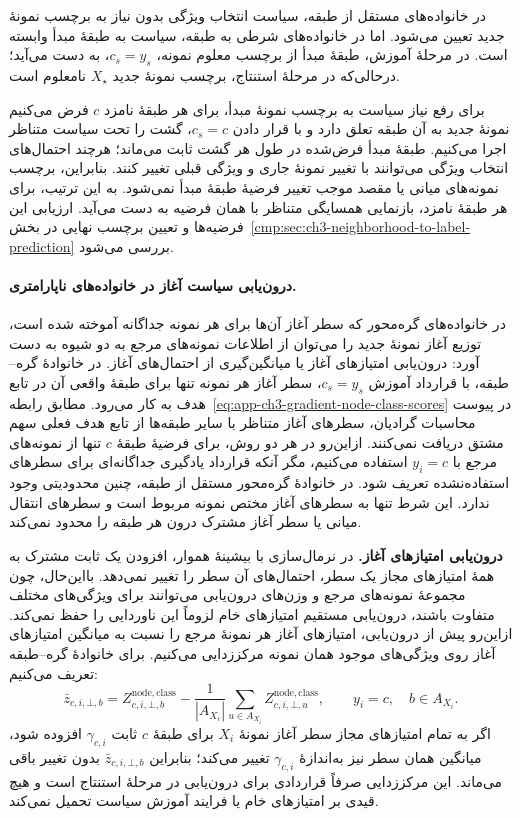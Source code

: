 در خانواده‌های مستقل از طبقه، سیاست انتخاب ویژگی بدون نیاز به
برچسب نمونهٔ جدید تعیین می‌شود. اما در خانواده‌های شرطی به طبقه،
سیاست به طبقهٔ مبدأ وابسته است. در مرحلهٔ آموزش، طبقهٔ مبدأ از برچسب
معلوم نمونه، $c_s=y_s$، به دست می‌آید؛ درحالی‌که در مرحلهٔ استنتاج،
برچسب نمونهٔ جدید $X_\star$ نامعلوم است.

برای رفع نیاز سیاست به برچسب نمونهٔ مبدأ، برای هر طبقهٔ
نامزد $c$ فرض می‌کنیم نمونهٔ جدید
به آن طبقه تعلق دارد و با قرار دادن $c_s=c$، گشت را تحت سیاست
متناظر اجرا می‌کنیم. طبقهٔ مبدأ فرض‌شده در طول هر گشت ثابت می‌ماند؛
هرچند احتمال‌های انتخاب ویژگی می‌توانند با تغییر نمونهٔ جاری و
ویژگی قبلی تغییر کنند. بنابراین، برچسب نمونه‌های میانی یا مقصد
موجب تغییر فرضیهٔ طبقهٔ مبدأ نمی‌شود. به این ترتیب، برای هر طبقهٔ
نامزد، بازنمایی همسایگی متناظر با همان فرضیه به دست می‌آید.
ارزیابی این فرضیه‌ها و تعیین برچسب نهایی در
بخش~\ref{cmp:sec:ch3-neighborhood-to-label-prediction}
بررسی می‌شود.

\paragraph{درون‌یابی سیاست آغاز در خانواده‌های ناپارامتری.}
در خانواده‌های گره‌محور که سطر آغاز آن‌ها برای هر نمونه جداگانه
آموخته شده است، توزیع آغاز نمونهٔ جدید را می‌توان از اطلاعات
نمونه‌های مرجع به دو شیوه به دست آورد: درون‌یابی امتیازهای آغاز
یا میانگین‌گیری از احتمال‌های آغاز.
در خانوادهٔ گره--طبقه، با قرارداد آموزش
$c_s=y_s$، سطر آغاز هر نمونه تنها برای
طبقهٔ واقعی آن در تابع هدف به کار می‌رود.
مطابق رابطه~\eqref{eq:app-ch3-gradient-node-class-scores}
در پیوست محاسبات گرادیان، سطرهای آغاز متناظر
با سایر طبقه‌ها از تابع هدف فعلی سهم مشتق
دریافت نمی‌کنند. ازاین‌رو در هر دو روش،
برای فرضیهٔ طبقهٔ $c$ تنها از نمونه‌های مرجع
با $y_i=c$ استفاده می‌کنیم، مگر آنکه قرارداد
یادگیری جداگانه‌ای برای سطرهای استفاده‌نشده
تعریف شود. در خانوادهٔ گره‌محور مستقل از
طبقه، چنین محدودیتی وجود ندارد.
این شرط تنها به سطرهای آغاز مختص نمونه
مربوط است و سطرهای انتقال میانی یا سطر آغاز
مشترک درون هر طبقه را محدود نمی‌کند.

\noindent\textbf{درون‌یابی امتیازهای آغاز.}
در نرمال‌سازی با بیشینهٔ هموار، افزودن یک ثابت مشترک
به همهٔ امتیازهای مجاز یک سطر، احتمال‌های آن سطر را
تغییر نمی‌دهد. بااین‌حال، چون مجموعهٔ نمونه‌های مرجع
و وزن‌های درون‌یابی می‌توانند برای ویژگی‌های مختلف
متفاوت باشند، درون‌یابی مستقیم امتیازهای خام لزوماً
این ناوردایی را حفظ نمی‌کند. ازاین‌رو پیش از درون‌یابی،
امتیازهای آغاز هر نمونهٔ مرجع را نسبت به میانگین
امتیازهای آغاز روی ویژگی‌های موجود همان نمونه
مرکززدایی می‌کنیم. برای خانوادهٔ گره--طبقه تعریف می‌کنیم:
\begin{equation}\label{cmp:eq:ch3-out-of-graph-centered-start}
\boxed{
\bar z_{c,i,\bot,b}
=
Z^{\mathrm{node,class}}_{c,i,\bot,b}
-\frac{1}{|A_{X_i}|}
\sum_{u\in A_{X_i}}
Z^{\mathrm{node,class}}_{c,i,\bot,u},
\qquad y_i=c,\quad b\in A_{X_i}.
}
\end{equation}
اگر به تمام امتیازهای مجاز سطر آغاز نمونهٔ $X_i$
برای طبقهٔ $c$ ثابت $\gamma_{c,i}$ افزوده شود،
میانگین همان سطر نیز به‌اندازهٔ $\gamma_{c,i}$
تغییر می‌کند؛ بنابراین $\bar z_{c,i,\bot,b}$ بدون
تغییر باقی می‌ماند. این مرکززدایی صرفاً قراردادی
برای درون‌یابی در مرحلهٔ استنتاج است و هیچ قیدی
بر امتیازهای خام یا فرایند آموزش سیاست تحمیل نمی‌کند.

